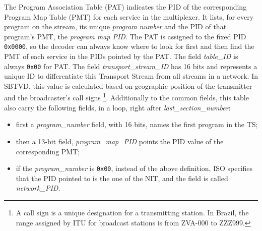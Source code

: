 \documentclass[
	12pt,				%
	openright,			%
	twoside,			%
	a4paper,			%
	brazil,
	french,				%
	english
	]{abntex2}
\begin{document}
The Program Association Table (PAT) indicates the PID of the corresponding Program Map Table (PMT) for each service in the multiplexer. It lists, for every program on the stream, its unique \textit{program number} and the PID of that program's PMT, the \textit{program map PID}. The PAT is assigned to the fixed PID \texttt{0x0000}, so the decoder can always know where to look for first and then find the PMT of each service in the PIDs pointed by the PAT. The field \textit{table\hspace{0.1mm}\_\hspace{0.1mm}ID} is always \texttt{0x00} for PAT. The field \textit{transport\hspace{0.1mm}\_\hspace{0.1mm}stream\hspace{0.1mm}\_\hspace{0.1mm}ID} has 16 bits and represents a unique ID to differentiate this Transport Stream from all streams in a network. In SBTVD, this value is calculated based on geographic position of the transmitter and the broadcaster's call signs \footnote{A call sign is a unique designation for a transmitting station. In Brazil, the range assigned by ITU for broadcast stations is from ZVA-000 to ZZZ999.}. Additionally to the common fields, this table also carry the following fields, in a loop, right after \textit{last\hspace{0.1mm}\_\hspace{0.1mm}section\hspace{0.1mm}\_\hspace{0.1mm}number}:

\begin{itemize}
\item{first a \textit{program\hspace{0.1mm}\_\hspace{0.1mm}number} field, with 16 bits, names the first program in the TS;}
\item{ then a 13-bit field, \textit{program\hspace{0.1mm}\_\hspace{0.1mm}map\hspace{0.1mm}\_\hspace{0.1mm}PID} points the PID value of the corresponding PMT;}
\item{if the \textit{program\hspace{0.1mm}\_\hspace{0.1mm}number} is \texttt{0x00}, instead of the above definition, ISO specifies that the PID pointed to is the one of the NIT, and the field is called \textit{network\hspace{0.1mm}\_\hspace{0.1mm}PID}.}
\end{itemize}
\end{document}

